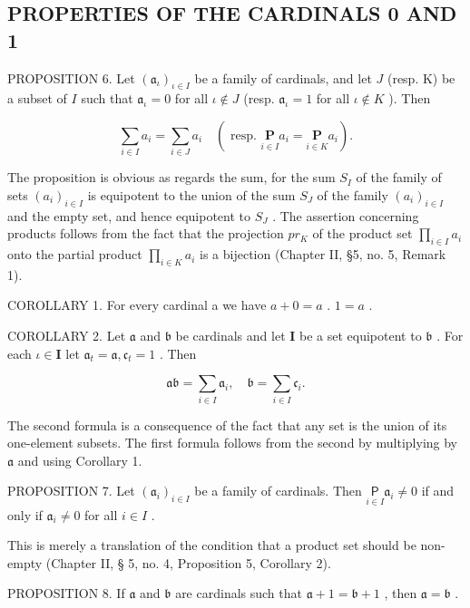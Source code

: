 \subsection{PROPERTIES OF THE CARDINALS 0 AND 1}

PROPOSITION 6. Let \((\mathfrak{a}_{\iota})_{\iota \in I}\) be a family of cardinals, and let \(J\) (resp. K) be a subset of \(I\) such that \(\mathfrak{a}_{\iota} = 0\) for all \(\iota \notin J\) (resp. \(\mathfrak{a}_{\iota} = 1\) for all \(\iota \notin K\) ). Then

\[
\sum_ {i \in I} a _ {i} = \sum_ {i \in J} a _ {i} \quad \left(\text { resp. } \underset {i \in I} {\mathbf {P}} a _ {i} = \underset {i \in K} {\mathbf {P}} a _ {i}\right).
\]

The proposition is obvious as regards the sum, for the sum \(S_{I}\) of the family of sets \((a_{i})_{i\in I}\) is equipotent to the union of the sum \(S_{J}\) of the family \((a_{i})_{i\in I}\) and the empty set, and hence equipotent to \(S_{J}\) . The assertion concerning products follows from the fact that the projection \(pr_{K}\) of the product set \(\prod_{i\in I} a_{i}\) onto the partial product \(\prod_{i\in K} a_{i}\) is a bijection (Chapter II, §5, no. 5, Remark 1).

COROLLARY 1. For every cardinal a we have \(a + 0 = a\) . \(1 = a\) .

COROLLARY 2. Let \(\mathfrak{a}\) and \(\mathfrak{b}\) be cardinals and let \(\mathbf{I}\) be a set equipotent to \(\mathfrak{b}\) . For each \(\iota \in \mathbf{I}\) let \(\mathfrak{a}_t = \mathfrak{a}, \mathfrak{c}_t = 1\) . Then

\[
\mathfrak {a}\mathfrak {b} = \sum_ {i \in I} \mathfrak {a} _ {i}, \quad \mathfrak {b} = \sum_ {i \in I} \mathfrak {c} _ {i}.
\]

The second formula is a consequence of the fact that any set is the union of its one-element subsets. The first formula follows from the second by multiplying by \(\mathfrak{a}\) and using Corollary 1.

PROPOSITION 7. Let \((\mathfrak{a}_{i})_{i\in I}\) be a family of cardinals. Then \(\underset{i\in I}{\mathsf{P}}\mathfrak{a}_{i}\neq 0\) if and only if \(\mathfrak{a}_i\neq 0\) for all \(i\in I\) .

This is merely a translation of the condition that a product set should be non-empty (Chapter II, § 5, no. 4, Proposition 5, Corollary 2).

PROPOSITION 8. If \(\mathfrak{a}\) and \(\mathfrak{b}\) are cardinals such that \(\mathfrak{a} + 1 = \mathfrak{b} + 1\) , then \(\mathfrak{a} = \mathfrak{b}\) .

